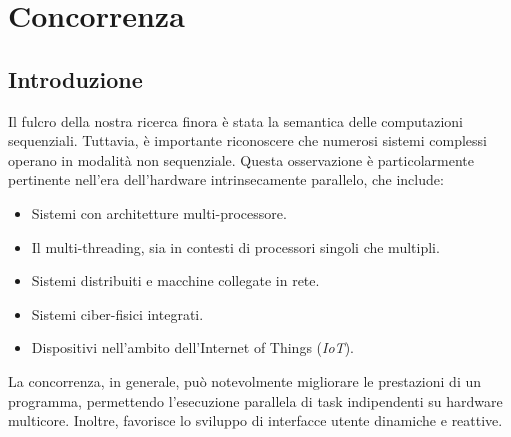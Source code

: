 \chapter{Concorrenza}
\section{Introduzione}

Il fulcro della nostra ricerca finora è stata la semantica
delle computazioni sequenziali. Tuttavia, è importante riconoscere
che numerosi sistemi complessi operano in modalità non sequenziale.
Questa osservazione è particolarmente pertinente nell'era
dell'hardware intrinsecamente parallelo, che include:
\begin{itemize}
    \item Sistemi con architetture multi-processore.
    \item Il multi-threading, sia in contesti di processori
    singoli che multipli.
    \item Sistemi distribuiti e macchine collegate in rete.
    \item Sistemi ciber-fisici integrati.
    \item Dispositivi nell'ambito dell'Internet of Things (\textit{IoT}).
\end{itemize}
La concorrenza, in generale, può notevolmente migliorare le
prestazioni di un programma, permettendo l'esecuzione parallela
di task indipendenti su hardware multicore. Inoltre, favorisce
lo sviluppo di interfacce utente dinamiche e reattive.

